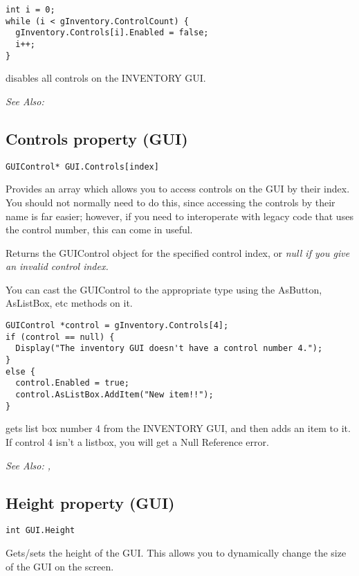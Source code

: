 \begin{verbatim}
int i = 0;
while (i < gInventory.ControlCount) {
  gInventory.Controls[i].Enabled = false;
  i++;
}
\end{verbatim}
disables all controls on the INVENTORY GUI.

\it{See Also:} 


\subsection{Controls property (GUI)}\label{GUI.Controls}%

\begin{verbatim}
GUIControl* GUI.Controls[index]
\end{verbatim}
Provides an array which allows you to access controls on the GUI by their index. You should
not normally need to do this, since accessing the controls by their name is far easier;
however, if you need to interoperate with legacy code that uses the control number, this
can come in useful.

Returns the GUIControl object for the specified control index, or \it{null} if you
give an invalid control index.

You can cast the GUIControl to the appropriate type using the AsButton, AsListBox, etc
methods on it.

\begin{verbatim}
GUIControl *control = gInventory.Controls[4];
if (control == null) {
  Display("The inventory GUI doesn't have a control number 4.");
}
else {
  control.Enabled = true;
  control.AsListBox.AddItem("New item!!");
}
\end{verbatim}
gets list box number 4 from the INVENTORY GUI, and then adds an item to it.
If control 4 isn't a listbox, you will get a Null Reference error.

\it{See Also:} ,


\subsection{Height property (GUI)}\label{GUI.Height}%

\begin{verbatim}
int GUI.Height
\end{verbatim}
Gets/sets the height of the GUI. This allows you to dynamically change the size
of the GUI on the screen.

